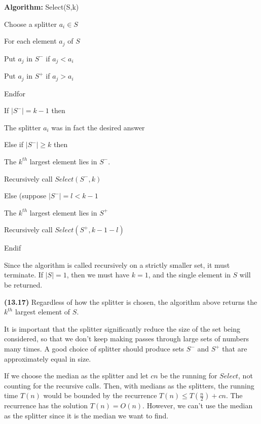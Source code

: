 \documentclass{proc}
\begin{document}
\begin{mdframed}
    \textbf{Algorithm:} Select(S,k)
    
    Choose a splitter $a_i \in S$
    
    For each element $a_j$ of $S$
    
    \hspace{2ex} Put $a_j$ in $S^-$ if $a_j < a_i$
    
    \hspace{2ex} Put $a_j$ in $S^+$ if $a_j > a_i$
    
    Endfor
    
    If $|S^-| = k - 1$ then

    \hspace{2ex} The splitter $a_i$ was in fact the desired answer

    Else if $|S^-| \ge k$ then

    \hspace{2ex} The $k^{th}$ largest element lies in $S^-$.
    
    \hspace{2ex} Recursively call $Select(S^-, k)$
    
    Else (suppose $|S^-| = l < k - 1$
    
    \hspace{2ex} The $k^{th}$ largest element lies in $S^+$
    
    \hspace{2ex} Recursively call $Select(S^+, k - 1 - l)$
    
    Endif
\end{mdframed}

Since the algorithm is called recursively on a strictly smaller set, it must terminate. If $|S| = 1$, then we must have $k = 1$, and the single element in $S$ will be returned.

\begin{mdframed}
    \textbf{(13.17)} Regardless of how the splitter is chosen, the algorithm above returns the $k^{th}$ largest element of $S$.
\end{mdframed}

It is important that the splitter significantly reduce the size of the set being considered, so that we don't keep making passes through large sets of numbers many times. A good choice of splitter should produce sets $S^-$ and $S^+$ that are approximately equal in size.

If we choose the median as the splitter and let $cn$ be the running for $Select$, not counting for the recursive calls. Then, with medians as the splitters, the running time $T(n)$ would be bounded by the recurrence $T(n) \le T(\frac{n}{2}) + cn$. The recurrence has the solution $T(n) = O(n)$. However, we can't use the median as the splitter since it is the median we want to find.
\end{document}
